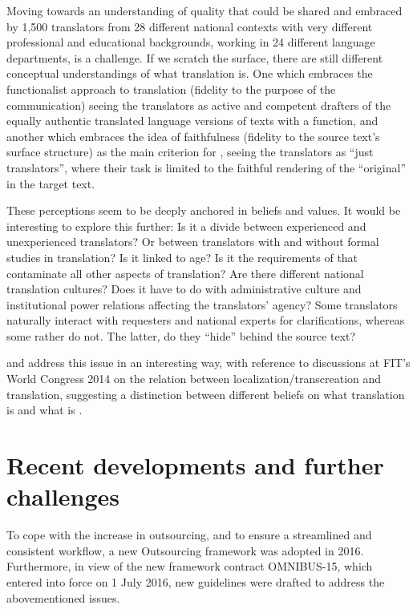 \documentclass[output=paper]{langsci/langscibook}
\begin{document}
Moving towards an understanding of quality that could be shared and embraced by 1,500 translators from 28 different national contexts with very different professional and educational backgrounds, working in 24 different language departments, is a challenge. If we scratch the surface, there are still different conceptual understandings of what translation is. One which embraces the functionalist approach to translation (fidelity to the purpose of the communication) seeing the translators as active and competent drafters of the equally authentic translated language versions of texts with a function, and another which embraces the idea of faithfulness (fidelity to the source text's surface structure) as the main criterion for , seeing the translators as ``just translators'', where their task is limited to the faithful rendering of the ``original'' in the target text. 

These perceptions seem to be deeply anchored in beliefs and values. It would be interesting to explore this further: Is it a divide between experienced and unexperienced translators? Or between translators with and without formal studies in translation? Is it linked to age? Is it the  requirements of  that contaminate all other aspects of translation? Are there different national translation cultures? Does it have to do with administrative culture and institutional power relations affecting the translators' agency? Some translators naturally interact with requesters and national experts for clarifications, whereas some rather do not. The latter, do they ``hide'' behind the source text? 

\citet{MelbyEtAl2014} and \citet{KobyEtAl2014} address this issue in an interesting way, with reference to discussions at FIT's World Congress 2014 on the relation between localization/transcreation and translation, suggesting a distinction between different beliefs on what translation is \citep[392--403]{MelbyEtAl2014} and what  is \citep[413--420]{KobyEtAl2014}.

\section{Recent developments and further challenges}\label{sec:strandvik:strandvic:6} 

To cope with the increase in outsourcing, and to ensure a streamlined and consistent workflow, a new Outsourcing framework was adopted in 2016. Furthermore, in view of the new framework contract OMNIBUS-15, which entered into force on 1 July 2016, new  guidelines were drafted to address the abovementioned issues. 
\end{document}
